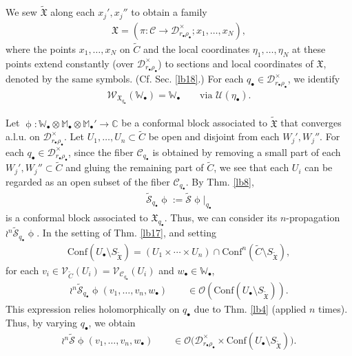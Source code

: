 \documentclass[12pt,a4paper,notitlepage]{article}
\theoremstyle{definition}
\theoremstyle{plain}
\newcommand{\fk}{\mathfrak}
\newcommand{\mc}{\mathcal}
\newcommand{\wtd}{\widetilde}
\newcommand{\Conf}{\mathrm{Conf}}
\newcommand{\scr}{\mathscr}
\newcommand{\blt}{\bullet}
\newcommand{\Wbb}{\mathbb W}
\newcommand{\Mbb}{\mathbb M}
\newcommand{\Cbb}{\mathbb C}
\newcommand{\SXtd}{S_{\wtd{\fk X}}}
\numberwithin{equation}{section}
\begin{document}
We sew $\wtd{\fk X}$ along each $x_j',x_j''$ to obtain a family
\begin{align*}
\fk X=(\pi:\mc C\rightarrow\mc D_{r_\blt\rho_\blt}^\times;x_1,\dots,x_N),	
\end{align*}
where the points $x_1,\dots,x_N$  on $\wtd C$  and the local coordinates $\eta_1,\dots,\eta_N$ at these points extend constantly (over $\mc D_{r_\blt\rho_\blt}^\times$) to sections and local coordinates of $\fk X$, denoted by the same symbols. (Cf. Sec. \ref{lb18}.) For each $q_\blt\in\mc D_{r_\blt\rho_\blt}^\times$, we identify
\begin{align*}
\scr W_{\fk X_{q_\blt}}(\Wbb_\blt)=\Wbb_\blt\qquad\text{via }\mc U(\eta_\blt).
\end{align*}


Let $\upphi:\Wbb_\blt\otimes\Mbb_\blt\otimes\Mbb_\blt'\rightarrow\Cbb$ be a conformal block associated to $\wtd{\fk X}$ that converges a.l.u. on $\mc D_{r_\blt\rho_\blt}^\times$. Let $U_1,\dots,U_n\subset \wtd C$ be open and disjoint from each $W_j',W_j''$. For each $q_\blt\in\mc D_{r_\blt\rho_\blt}^\times$, since the fiber $\mc C_{q_\blt}$ is obtained by removing a small part of each $W_j',W_j''\subset\wtd C$ and gluing the remaining part of $\wtd C$, we see that each $U_i$ can be regarded as an open subset of the fiber $\mc C_{q_\blt}$. By Thm. \ref{lb8},  \index{S@$\wtd{\mc S}_{q_\blt}\upphi$} 
\begin{align*}
\wtd{\mc S}_{q_\blt}\upphi:=\wtd{\mc S}\upphi|_{q_\blt}	
\end{align*}
is a conformal block associated to $\fk X_{q_\blt}$. Thus, we can consider its $n$-propagation $\wr^n\wtd{\mc S}_{q_\blt}\upphi$.  In the setting of Thm. \ref{lb17}, and setting
\begin{align*}
\Conf(U_\blt\setminus\SXtd)=(U_1\times\cdots\times U_n)\cap\Conf^n(\wtd C\setminus\SXtd),	
\end{align*}
for each $v_i\in\scr V_{\wtd C}(U_i)=\scr V_{\mc C_{q_\blt}}(U_i)$ and $w_\blt\in\Wbb_\blt$,
\begin{align*}
\wr^n\wtd{\mc S}_{q_\blt}\upphi(v_1,\dots,v_n,w_\blt)\qquad\in\scr O(\Conf(U_\blt\setminus\SXtd)).
\end{align*}
This expression relies holomorphically on $q_\blt$ due to  Thm. \ref{lb4} (applied $n$ times). Thus, by varying $q_\blt$, we obtain
\begin{align}
\wr^n\wtd{\mc S}\upphi(v_1,\dots,v_n,w_\blt)\qquad\in\scr O\big(\mc D_{r_\blt\rho_\blt}^\times\times\Conf(U_\blt\setminus\SXtd)\big).	\label{eq37}
\end{align}
\end{document}
